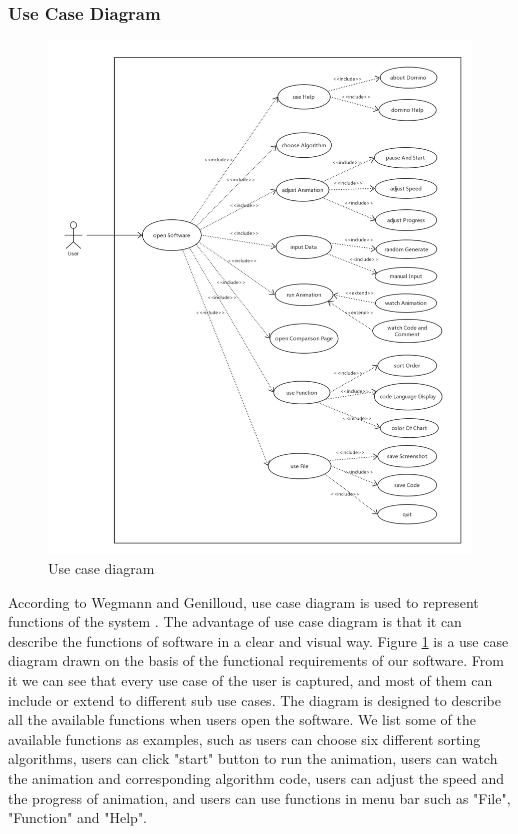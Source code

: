 \documentclass[paper=a4, fontsize=11pt,twoside]{scrartcl}		%
\begin{document}
\subsubsection{Use Case Diagram}
\begin{figure}[htbp]
\centering
\includegraphics[width=1\textwidth,height=1.3\textwidth]{usecase.png}
\caption{Use case diagram}
\label{usecase}
\end{figure}
According to Wegmann and Genilloud, use case diagram is used to represent functions of the system \cite{Wegmann2000The}. The advantage of use case diagram is that it can describe the functions of software in a clear and visual way. Figure \ref{usecase} is a use case diagram drawn on the basis of the functional requirements of our software. From it we can see that every use case of the user is captured, and most of them can include or extend to different sub use cases. The diagram is designed to describe all the available functions when users open the software. We list some of the available functions as examples, such as users can choose six different sorting algorithms, users can click "start" button to run the animation, users can watch the animation and corresponding algorithm code, users can adjust the speed and the progress of animation, and users can use functions in menu bar such as "File", "Function" and "Help".
\end{document}
